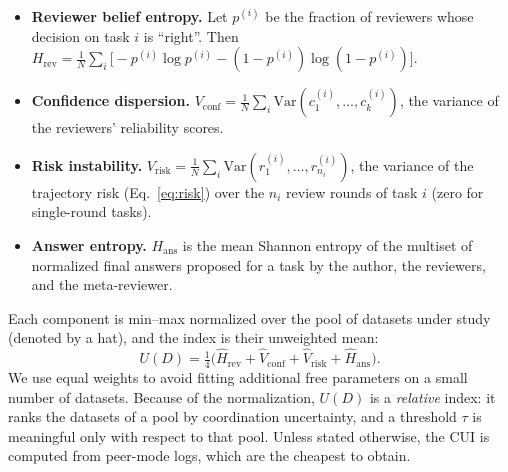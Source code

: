 \begin{itemize}
\item \textbf{Reviewer belief entropy.} Let \(p^{(i)}\) be the fraction of reviewers whose decision on task \(i\) is ``right''. Then
\(H_{\mathrm{rev}} = \tfrac1N\sum_i \big[-p^{(i)}\log p^{(i)} - (1-p^{(i)})\log(1-p^{(i)})\big]\).
\item \textbf{Confidence dispersion.} \(V_{\mathrm{conf}} = \tfrac1N\sum_i \mathrm{Var}(c^{(i)}_1,\ldots,c^{(i)}_k)\), the variance of the reviewers' reliability scores.
\item \textbf{Risk instability.} \(V_{\mathrm{risk}} = \tfrac1N\sum_i \mathrm{Var}(r^{(i)}_1,\ldots,r^{(i)}_{n_i})\), the variance of the trajectory risk (Eq.~\eqref{eq:risk}) over the \(n_i\) review rounds of task \(i\) (zero for single-round tasks).
\item \textbf{Answer entropy.} \(H_{\mathrm{ans}}\) is the mean Shannon entropy of the multiset of normalized final answers proposed for a task by the author, the reviewers, and the meta-reviewer.
\end{itemize}

Each component is min--max normalized over the pool of datasets under study (denoted by a hat), and the index is their unweighted mean:
\begin{equation}
\label{eq:cui}
U(D) = \tfrac14\big(\hat H_{\mathrm{rev}} + \hat V_{\mathrm{conf}} + \hat V_{\mathrm{risk}} + \hat H_{\mathrm{ans}}\big).
\end{equation}
We use equal weights to avoid fitting additional free parameters on a small number of datasets.
Because of the normalization, \(U(D)\) is a \emph{relative} index: it ranks the datasets of a pool by coordination uncertainty, and a threshold \(\tau\) is meaningful only with respect to that pool.
Unless stated otherwise, the CUI is computed from peer-mode logs, which are the cheapest to obtain.
